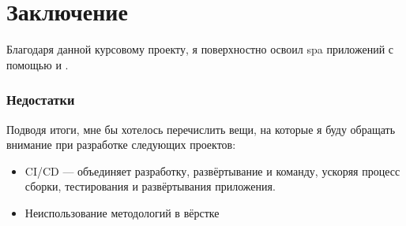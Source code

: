 \section{Заключение}
Благодаря данной курсовому проекту, я поверхностно освоил \acrshort{spa} приложений с помощью \textcite{react} и \textcite{express}.

\subsubsection{Недостатки}
Подводя итоги, мне бы хотелось перечислить вещи, на которые я буду обращать внимание при разработке следующих проектов:
\begin{itemize}
    \item CI/CD --- объединяет разработку, развёртывание и команду, ускоряя процесс сборки, тестирования и развёртывания приложения.
    \item Неиспользование методологий в вёрстке
\end{itemize}

\clearpage